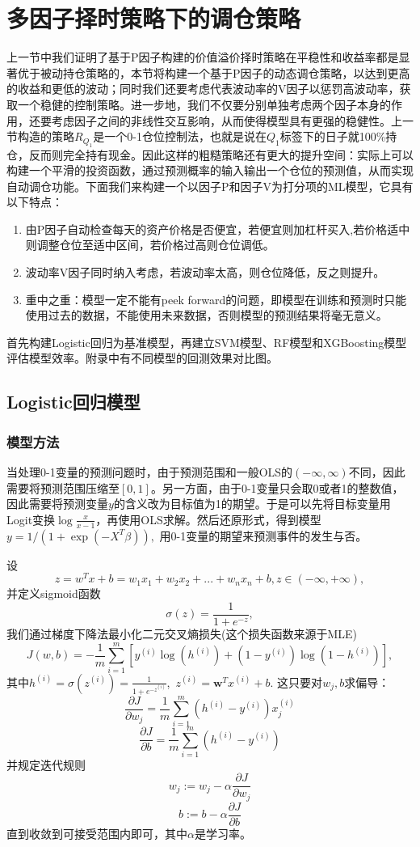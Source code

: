 \documentclass[11pt, a4paper]{article}
\begin{document}
\section{多因子择时策略下的调仓策略}
上一节中我们证明了基于P因子构建的价值溢价择时策略在平稳性和收益率都是显著优于被动持仓策略的，本节将构建一个基于P因子的动态调仓策略，以达到更高的收益和更低的波动；同时我们还要考虑代表波动率的V因子以惩罚高波动率，获取一个稳健的控制策略。进一步地，我们不仅要分别单独考虑两个因子本身的作用，还要考虑因子之间的非线性交互影响，从而使得模型具有更强的稳健性。上一节构造的策略$R_{Q_1}$是一个0-1仓位控制法，也就是说在$Q_1$标签下的日子就100\%持仓，反而则完全持有现金。因此这样的粗糙策略还有更大的提升空间：实际上可以构建一个平滑的投资函数，通过预测概率的输入输出一个仓位的预测值，从而实现自动调仓功能。下面我们来构建一个以因子P和因子V为打分项的ML模型，它具有以下特点：
\begin{enumerate}
    \item 由P因子自动检查每天的资产价格是否便宜，若便宜则加杠杆买入,若价格适中则调整仓位至适中区间，若价格过高则仓位调低。
    \item 波动率V因子同时纳入考虑，若波动率太高，则仓位降低，反之则提升。
    \item 重中之重：模型一定不能有peek forward的问题，即模型在训练和预测时只能使用过去的数据，不能使用未来数据，否则模型的预测结果将毫无意义。
\end{enumerate}
首先构建Logistic回归为基准模型，再建立SVM模型、RF模型和XGBoosting模型评估模型效率。附录中有不同模型的回测效果对比图。
\subsection{Logistic回归模型}
\subsubsection{模型方法}
当处理0-1变量的预测问题时，由于预测范围和一般OLS的$(-\infty,\infty)$不同，因此需要将预测范围压缩至$[0,1]$。另一方面，由于0-1变量只会取0或者1的整数值，因此需要将预测变量$y$的含义改为目标值为1的期望。于是可以先将目标变量用Logit变换$\log\frac{x}{x-1}$，再使用OLS求解。然后还原形式，得到模型
$y=1/{(1+\exp{(-X^T\beta)})},$
用0-1变量的期望来预测事件的发生与否。

设$$z = w^T x + b = w_1x_1 + w_2x_2 + ... + w_nx_n + b,z\in (-\infty, +\infty),$$
并定义sigmoid函数
$$\sigma(z) = \frac{1}{1 + e^{-z}},$$
我们通过梯度下降法最小化二元交叉熵损失(这个损失函数来源于MLE)
$$J(w, b) = -\frac{1}{m} \sum_{i=1}^{m} \left[ y^{(i)} \log(h^{(i)}) + (1-y^{(i)}) \log(1-h^{(i)}) \right],$$
其中$h^{(i)} = \sigma(z^{(i)}) = \frac{1}{1 + e^{-z^{(i)}}}$,\ $z^{(i)} = \mathbf{w}^T x^{(i)} + b$.
这只要对$w_j,b$求偏导：
$$\frac{\partial J}{\partial w_j} = \frac{1}{m} \sum_{i=1}^{m} (h^{(i)} - y^{(i)}) x_j^{(i)}$$
$$\frac{\partial J}{\partial b} = \frac{1}{m} \sum_{i=1}^{m} (h^{(i)} - y^{(i)})$$
并规定迭代规则
$$w_j := w_j - \alpha \frac{\partial J}{\partial w_j}$$
$$b := b - \alpha \frac{\partial J}{\partial b}$$
直到收敛到可接受范围内即可，其中$\alpha$是学习率。
\end{document}
